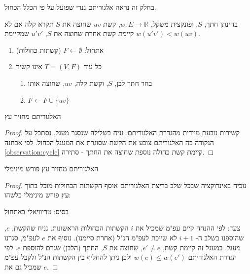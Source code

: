 בחלק זה נראה אלגוריתם גנרי שפועל על פי הכלל הכחול.

\begin{definition}
בהינתן חתך, $S$, ופונקצית משקל, 
$w: E \to \mathbb{R}$,
קשת $uv$ שחוצה את $S$ תקרא קלה אם לא קיימת קשת אחרת שחוצה את $S$, 
$u'v'$
שמקיימת 
$w(u'v') < w(uv)$.
\end{definition}
\begin{enumerate}
\item
אתחול:
$F \leftarrow \emptyset$ 
(קשתות כחולות)
\item
כל עוד 
$T = (V, F)$
אינו קשיר
\begin{enumerate}
\item
בחר חתך לבן, $S$, וקשת קלה, $uv$, שחוצה אותו 
\item
$F \leftarrow F \cup \{uv\}$
\end{enumerate}
\end{enumerate}

\begin{claim}
האלגוריתם מחזיר עץ
\end{claim}
\begin{proof}
קשירות נובעת מיידית מהגדרת האלגוריתם.
נניח בשלילה שנסגר מעגל.
נסתכל על הנקודה בה האלגוריתם צובע את הקשת שסוגרת את המעגל הכחול.
לפי אבחנה 
\ref{observation:cycle}
קיימת קשת כחולה נוספת שחוצה את החתך - סתירה.
\end{proof}

\begin{claim}
האלגוריתם מחזיר עץ פורש מינימלי
\end{claim}

\begin{proof}
נוכיח באינדוקציה שבכל שלב בריצת האלגוריתם אוסף הקשתות הכחולות מוכל בתוך עץ פורש מינימלי כלשהו:

בסיס: טריוויאלי באתחול

צעד: לפי ההנחה קיים עפ"מ שמכיל את $i$ הקשתות הכחולות הראשונות.
נניח שהקשת, $e$, שהוספנו בשלב ה-%
$i+1$
לא שייכת לעפ"מ הנ"ל (אחרת סיימנו).
נוסיף את $e$ לעפ"מ, סגרנו מעגל.
במעגל זה קיימת קשת,
$e' \neq e$,
שחוצה את $S$, החתך (הלבן) שגרם להוספת $e$.
לפי הגדרת האלגוריתם
$w(e) \leq w(e')$
ולכן ניתן להחליף בין הקשתות הנ"ל ולקבל עפ"מ שמכיל גם את $e$.
\end{proof}


